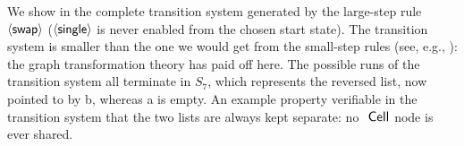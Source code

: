
We show in  the complete transition system generated by the
large-step rule ${{\langle \mathsf{swap} \rangle}}$ (${{\langle \mathsf{single} \rangle}}$ is never enabled from the chosen start
state). The transition system is smaller than the one we would get
from the small-step rules (see, e.g., \cite{SagRepWil98}): the graph
transformation theory has paid off here. The possible runs of the transition
system all terminate in $S_7$, which represents the reversed list, now pointed
to by \snip b, whereas \snip a is empty.  An example property verifiable in the
transition system that the two lists are always kept separate: no $\snip{Cell}$
node is ever shared.
%

